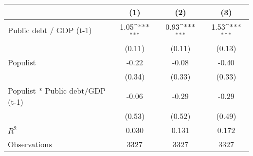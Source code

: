 {
\def\sym#1{\ifmmode^{#1}\else\(^{#1}\)\fi}
\begin{tabular}{l*{3}{c}}
\hline\hline
                                          &\multicolumn{1}{c}{(1)}         &\multicolumn{1}{c}{(2)}         &\multicolumn{1}{c}{(3)}         \\
\hline
Public debt / GDP (t-1)                   &      1.05\sym{***}&      0.93\sym{***}&      1.53\sym{***}\\
                                          &    (0.11)         &    (0.11)         &    (0.13)         \\
[1em]
Populist                                  &     -0.22         &     -0.08         &     -0.40         \\
                                          &    (0.34)         &    (0.33)         &    (0.33)         \\
[1em]
Populist * Public debt/GDP (t-1)          &     -0.06         &     -0.29         &     -0.29         \\
                                          &    (0.53)         &    (0.52)         &    (0.49)         \\
\hline
\(R^{2}\)                                 &     0.030         &     0.131         &     0.172         \\
Observations                              &      3327         &      3327         &      3327         \\
\hline\hline
\end{tabular}
}
